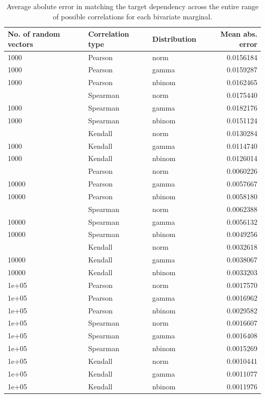 \documentclass{article}
\begin{document}
\begin{table}

\caption{\label{tab:ch040-BiError}Average abolute error in matching the target dependency across the entire range of possible correlations for each bivariate marginal.}
\centering
\begin{tabular}[t]{lllr}
\toprule
No. of random vectors & Correlation type & Distribution & Mean abs. error\\
\midrule
1000 & Pearson & norm & 0.0156184\\
1000 & Pearson & gamma & 0.0159287\\
1000 & Pearson & nbinom & 0.0162465\\
\addlinespace
1000 & Spearman & norm & 0.0175440\\
1000 & Spearman & gamma & 0.0182176\\
1000 & Spearman & nbinom & 0.0151124\\
\addlinespace
1000 & Kendall & norm & 0.0130284\\
1000 & Kendall & gamma & 0.0114740\\
1000 & Kendall & nbinom & 0.0126014\\
\addlinespace
10000 & Pearson & norm & 0.0060226\\
10000 & Pearson & gamma & 0.0057667\\
10000 & Pearson & nbinom & 0.0058180\\
\addlinespace
10000 & Spearman & norm & 0.0062388\\
10000 & Spearman & gamma & 0.0056132\\
10000 & Spearman & nbinom & 0.0049256\\
\addlinespace
10000 & Kendall & norm & 0.0032618\\
10000 & Kendall & gamma & 0.0038067\\
10000 & Kendall & nbinom & 0.0033203\\
\addlinespace
1e+05 & Pearson & norm & 0.0017570\\
1e+05 & Pearson & gamma & 0.0016962\\
1e+05 & Pearson & nbinom & 0.0029582\\
\addlinespace
1e+05 & Spearman & norm & 0.0016607\\
1e+05 & Spearman & gamma & 0.0016408\\
1e+05 & Spearman & nbinom & 0.0015269\\
\addlinespace
1e+05 & Kendall & norm & 0.0010441\\
1e+05 & Kendall & gamma & 0.0011077\\
1e+05 & Kendall & nbinom & 0.0011976\\
\bottomrule
\end{tabular}
\end{table}
\end{document}
